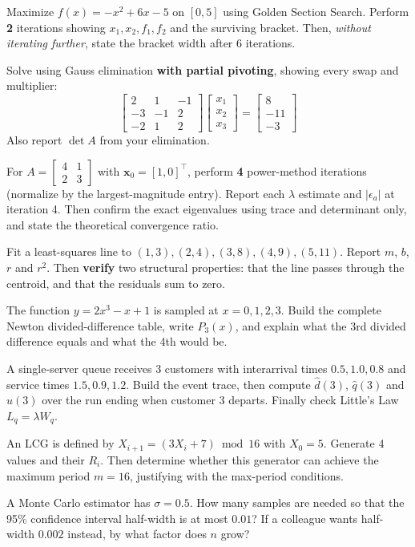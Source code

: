 \begin{probbox}
 Maximize $f(x) = -x^2 + 6x - 5$ on $[0,5]$ using Golden Section Search. Perform \textbf{2} iterations showing $x_1, x_2, f_1, f_2$ and the surviving bracket. Then, \emph{without iterating further}, state the bracket width after 6 iterations.

 Solve using Gauss elimination \textbf{with partial pivoting}, showing every swap and multiplier:
\[
\begin{bmatrix}2&1&-1\\-3&-1&2\\-2&1&2\end{bmatrix}\begin{bmatrix}x_1\\x_2\\x_3\end{bmatrix}=\begin{bmatrix}8\\-11\\-3\end{bmatrix}
\]
Also report $\det A$ from your elimination.

 For $A=\begin{bmatrix}4&1\\2&3\end{bmatrix}$ with $\mathbf x_0=[1,0]^\top$, perform \textbf{4} power-method iterations (normalize by the largest-magnitude entry). Report each $\lambda$ estimate and $|\epsilon_a|$ at iteration 4. Then confirm the exact eigenvalues using trace and determinant only, and state the theoretical convergence ratio.

 Fit a least-squares line to $(1,3),(2,4),(3,8),(4,9),(5,11)$. Report $m$, $b$, $r$ and $r^2$. Then \textbf{verify} two structural properties: that the line passes through the centroid, and that the residuals sum to zero.

 The function $y = 2x^3 - x + 1$ is sampled at $x = 0,1,2,3$. Build the complete Newton divided-difference table, write $P_3(x)$, and explain what the 3rd divided difference equals and what the 4th would be.

 A single-server queue receives 3 customers with interarrival times $0.5, 1.0, 0.8$ and service times $1.5, 0.9, 1.2$. Build the event trace, then compute $\hat d(3)$, $\hat q(3)$ and $\hat u(3)$ over the run ending when customer 3 departs. Finally check Little's Law $L_q = \lambda W_q$.

 An LCG is defined by $X_{i+1} = (3X_i + 7) \bmod 16$ with $X_0 = 5$. Generate 4 values and their $R_i$. Then determine whether this generator can achieve the maximum period $m = 16$, justifying with the max-period conditions.

 A Monte Carlo estimator has $\sigma = 0.5$. How many samples are needed so that the 95\% confidence interval half-width is at most $0.01$? If a colleague wants half-width $0.002$ instead, by what factor does $n$ grow?
\end{probbox}

